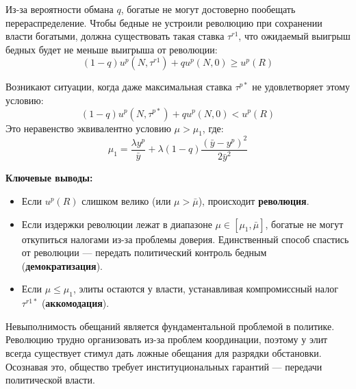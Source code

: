 \begin{theorem}
Из-за вероятности обмана $q$, богатые не могут достоверно пообещать перераспределение. Чтобы бедные не устроили революцию при сохранении власти богатыми, должна существовать такая ставка $\tau^{r1}$, что ожидаемый выигрыш бедных будет не меньше выигрыша от революции:
\begin{equation}
    (1 - q)u^p(N, \tau^{r1}) + q u^p(N, 0) \ge u^p(R)
\end{equation}
\end{theorem}

Возникают ситуации, когда даже максимальная ставка $\tau^{p*}$ не удовлетворяет этому условию:
\begin{equation}
    (1 - q)u^p(N, \tau^{p*}) + q u^p(N, 0) < u^p(R)
\end{equation}
Это неравенство эквивалентно условию $\mu > \mu_1$, где:
\begin{equation}
    \mu_1 = \frac{\lambda y^p}{\bar{y}} + \lambda(1 - q)\frac{(\bar{y} - y^p)^2}{2\bar{y}^2}
\end{equation}

\textbf{Ключевые выводы:}
\begin{itemize}
    \item Если $u^p(R)$ слишком велико (или $\mu > \bar{\mu}$), происходит \textbf{революция}.
    \item Если издержки революции лежат в диапазоне $\mu \in [\mu_1, \bar{\mu}]$, богатые не могут откупиться налогами из-за проблемы доверия. Единственный способ спастись от революции --- передать политический контроль бедным (\textbf{демократизация}).
    \item Если $\mu \le \mu_1$, элиты остаются у власти, устанавливая компромиссный налог $\tau^{r1*}$ (\textbf{аккомодация}).
\end{itemize}

Невыполнимость обещаний является фундаментальной проблемой в политике. Революцию трудно организовать из-за проблем координации, поэтому у элит всегда существует стимул дать ложные обещания для разрядки обстановки. Осознавая это, общество требует институциональных гарантий --- передачи политической власти.
